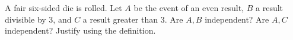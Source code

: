 A fair six-sided die is rolled. Let $ A $ be the event of an even result, $ B $ a result divisible by 3, and $ C $ a result greater than 3. Are $ A,B $ independent? Are $ A,C $ independent? Justify using the definition.
